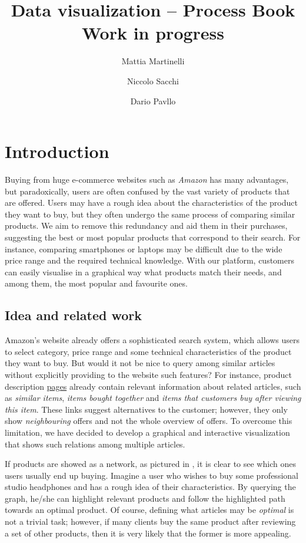 \documentclass[a4paper,12pt]{article}
\title{Data visualization -- Process Book\\\textbf{Work in progress}}
\author{Mattia Martinelli \and Niccolo Sacchi \and Dario Pavllo}
\date{} %
\begin{document}
\maketitle
{}
\section{Introduction}
\label{sec:introduction}
Buying from huge e-commerce websites such as \emph{Amazon} has many advantages, but paradoxically, users are often confused by the vast variety of products that are offered. Users may have a rough idea about the characteristics of the product they want to buy, but they often undergo the same process of comparing similar products. We aim to remove this redundancy and aid them in their purchases, suggesting the best or most popular products that correspond to their search. For instance, comparing smartphones or laptops may be difficult due to the wide price range and the required technical knowledge. With our platform, customers can easily visualise in a graphical way what products match their needs, and among them, the most popular and favourite ones.

\subsection{Idea and related work}
Amazon's website already offers a sophisticated search system, which allows users to select category, price range and some technical characteristics of the product they want to buy. But would it not be nice to query among similar articles without explicitly providing to the website such features? For instance, product description  \href{https://www.amazon.com/Acer-E5-575-33BM-15-6-Inch-Notebook-Generation/dp/B01K1IO3QW/ref=sr_1_3?s=pc&ie=UTF8&qid=1512207600&sr=1-3&keywords=laptop}{pages} already contain relevant information about related articles, such as \textit{similar items}, \textit{items bought together} and \textit{items that customers buy after viewing this item}. These links suggest alternatives to the customer; however, they only show \textit{neighbouring} offers and not the whole overview of offers. To overcome this limitation, we have decided to develop a graphical and interactive visualization that shows such relations among multiple articles.

If products are showed as a network, as pictured in , it is clear to see which ones users usually end up buying. Imagine a user who wishes to buy some professional studio headphones and has a rough idea of their characteristics. By querying the graph, he/she can highlight relevant products and follow the highlighted path towards an optimal product. Of course, defining what articles may be \emph{optimal} is not a trivial task; however, if many clients buy the same product after reviewing a set of other products, then it is very likely that the former is more appealing. 
\end{document}
